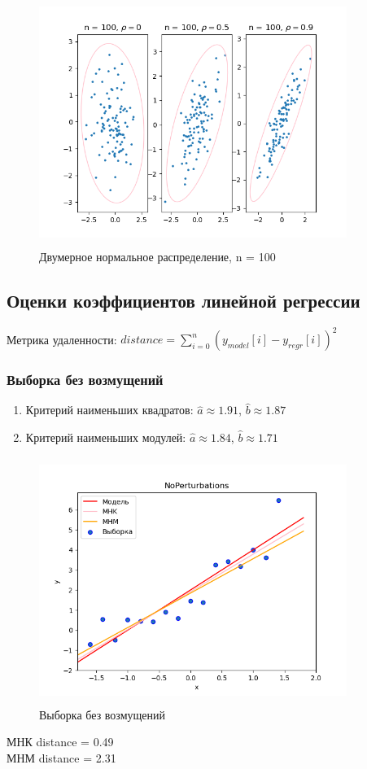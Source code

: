 	\begin{figure}[H]
		\centering
		\includegraphics[width = 10cm, height = 8cm]{pics/n100.png}
		\caption{Двумерное нормальное распределение, n = 100}
		\label{fig:n100}
	\end{figure}

	
\subsection{Оценки коэффициентов линейной регрессии}

Метрика удаленности: $distance = \sum_{i=0}^{n}(y_{model}[i]-y_{regr}[i])^2$
\subsubsection{Выборка без возмущений}
\begin{enumerate}
	\item{Критерий наименьших квадратов:}
	$\hat{a}\approx 1.91$, $\hat{b}\approx 1.87$
	\item{Критерий наименьших модулей:}
	$\hat{a}\approx 1.84$, $\hat{b}\approx 1.71$
\end{enumerate}
\begin{figure}[H]
	\centering
	\includegraphics[width = 10cm, height = 8cm]{pics/NoPerturbations.png}
	\caption{Выборка без возмущений}
	\label{w/o_pert}
\end{figure}
МНК distance = 0.49 \\
МНМ distance = 2.31

